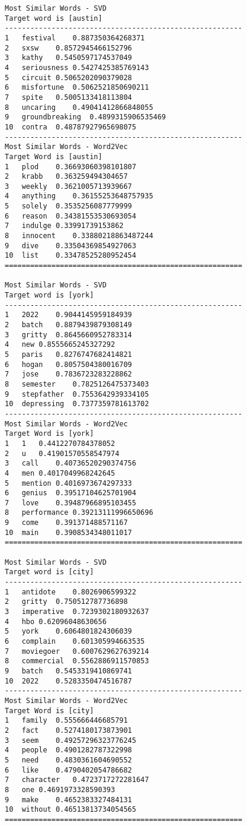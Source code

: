 \documentclass[12pt, letterpaper]{article}
\begin{document}
\begin{lstlisting}
Most Similar Words - SVD
Target word is [austin]
--------------------------------------------------------
1	festival	0.887350364268371
2	sxsw	0.8572945466152796
3	kathy	0.5450597174537049
4	seriousness	0.5427425385769143
5	circuit	0.5065202090379028
6	misfortune	0.5062521850690211
7	spite	0.5005133418113804
8	uncaring	0.49041412866848055
9	groundbreaking	0.4899315906535469
10	contra	0.48787927965698075
--------------------------------------------------------
Most Similar Words - Word2Vec
Target Word is [austin]
1	plod	0.36693060398101807
2	krabb	0.363259494304657
3	weekly	0.3621005713939667
4	anything	0.36155253648757935
5	solely	0.3535256087779999
6	reason	0.34381553530693054
7	indulge	0.33991739153862
8	innocent	0.33880218863487244
9	dive	0.33504369854927063
10	list	0.33478525280952454
========================================================

Most Similar Words - SVD
Target word is [york]
--------------------------------------------------------
1	2022	0.9044145959184939
2	batch	0.8879439879308149
3	gritty	0.8645660952783314
4	new	0.8555665245327292
5	paris	0.8276747682414821
6	hogan	0.8057504380016709
7	jose	0.7836723283228862
8	semester	0.7825126475373403
9	stepfather	0.7553642939334105
10	depressing	0.7377359781613702
--------------------------------------------------------
Most Similar Words - Word2Vec
Target Word is [york]
1	1	0.4412270784378052
2	u	0.41901570558547974
3	call	0.40736520290374756
4	men	0.4017049968242645
5	mention	0.4016973674297333
6	genius	0.39517104625701904
7	love	0.39487966895103455
8	performance	0.39213111996650696
9	come	0.391371488571167
10	main	0.3908534348011017
========================================================

Most Similar Words - SVD
Target word is [city]
--------------------------------------------------------
1	antidote	0.8026906599322
2	gritty	0.750512787736898
3	imperative	0.7239302180932637
4	hbo	0.62096048630656
5	york	0.6064801824306039
6	complain	0.601305994663535
7	moviegoer	0.6007629627639214
8	commercial	0.5562886911570853
9	batch	0.5453319410869741
10	2022	0.5283350474516787
--------------------------------------------------------
Most Similar Words - Word2Vec
Target Word is [city]
1	family	0.555666446685791
2	fact	0.5274180173873901
3	seem	0.49257296323776245
4	people	0.4901282787322998
5	need	0.4830361604690552
6	like	0.4790402054786682
7	character	0.4723717272281647
8	one	0.4691973328590393
9	make	0.4652383327484131
10	without	0.46513813734054565
========================================================


\end{lstlisting}
\end{document}
